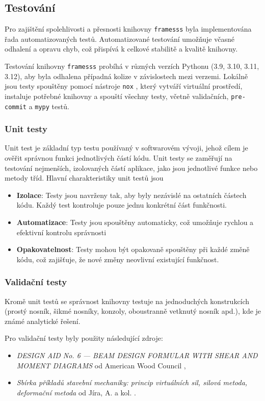 \subsection{Testování}

Pro zajištění spolehlivosti a přesnosti knihovny \texttt{framesss} byla implementována řada automatizovaných testů. Automatizované testování umožňuje včasné odhalení a opravu chyb, což přispívá k celkové stabilitě a kvalitě knihovny.

Testování knihovny \texttt{framesss} probíhá v různých verzích Pythonu (3.9, 3.10, 3.11, 3.12), aby byla odhalena případná kolize v závislostech mezi verzemi. Lokálně jsou testy spouštěny pomocí nástroje \texttt{nox} \cite{nox}, který vytváří virtuální prostředí, instaluje potřebné knihovny a spouští všechny testy, včetně validačních, \texttt{pre-commit} \cite{precommit} a \texttt{mypy} \cite{mypy} testů.

\subsubsection*{Unit testy}
Unit test je základní typ testu používaný v softwarovém vývoji, jehož cílem je ověřit správnou funkci jednotlivých částí kódu. Unit testy se zaměřují na testování nejmenších, izolovaných částí aplikace, jako jsou jednotlivé funkce nebo metody tříd. Hlavní charakteristiky unit testů jsou
\begin{itemize}
    \item \textbf{Izolace}: Testy jsou navrženy tak, aby byly nezávislé na ostatních částech kódu. Každý test kontroluje pouze jednu konkrétní část funkčnosti.
    \item \textbf{Automatizace}: Testy jsou spouštěny automaticky, což umožňuje rychlou a efektivní kontrolu správnosti
    \item \textbf{Opakovatelnost}: Testy mohou být opakovaně spouštěny při každé změně kódu, což zajišťuje, že nové změny neovlivní existující funkčnost.
\end{itemize}

\subsubsection*{Validační testy}
Kromě unit testů se správnost knihovny testuje na jednoduchých konstrukcích (prostý nosník, šikmé nosníky, konzoly, oboustranně vetknutý nosník apd.), kde je známé analytické řešení.

Pro validační testy byly použity následující zdroje:
\begin{itemize}
    \item \textit{DESIGN AID No. 6 — BEAM DESIGN FORMULAR WITH SHEAR AND MOMENT DIAGRAMS} od American Wood Council \cite{design_aid},
    \item \textit{Sbírka příkladů stavební mechaniky: princip virtuálních sil, silová metoda, deformační metoda} od Jíra, A. a kol. \cite{sbirka_prikladu}.
\end{itemize}

